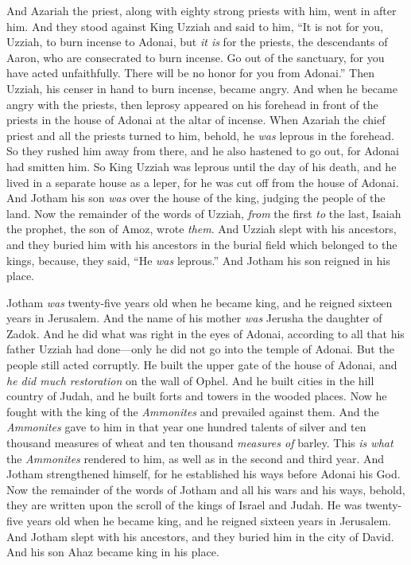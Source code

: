 \begin{biblechapter}
\verse And Azariah the priest, along with eighty strong priests with him, went in after him.
\verse And they stood against King Uzziah and said to him, “It is not for you, Uzziah, to burn incense to Adonai, but \textit{it is} for the priests, the descendants of Aaron, who are consecrated to burn incense. Go out of the sanctuary, for you have acted unfaithfully. There will be no honor for you from Adonai.”
\verse Then Uzziah, his censer in hand to burn incense, became angry. And when he became angry with the priests, then leprosy appeared on his forehead in front of the priests in the house of Adonai at the altar of incense.
\verse When Azariah the chief priest and all the priests turned to him, behold, he \textit{was} leprous in the forehead. So they rushed him away from there, and he also hastened to go out, for Adonai had smitten him.
\verse So King Uzziah was leprous until the day of his death, and he lived in a separate house as a leper, for he was cut off from the house of Adonai. And Jotham his son \textit{was} over the house of the king, judging the people of the land.
\verse Now the remainder of the words of Uzziah, \textit{from} the first \textit{to} the last, Isaiah the prophet, the son of Amoz, wrote \textit{them}.
\verse And Uzziah slept with his ancestors, and they buried him with his ancestors in the burial field which belonged to the kings, because, they said, “He \textit{was} leprous.” And Jotham his son reigned in his place.
\end{biblechapter}

\begin{biblechapter} %
 Jotham \textit{was} twenty-five years old when he became king, and he reigned sixteen years in Jerusalem. And the name of his mother \textit{was} Jerusha the daughter of Zadok.
\verse And he did what was right in the eyes of Adonai, according to all that his father Uzziah had done—only he did not go into the temple of Adonai. But the people still acted corruptly.
\verse He built the upper gate of the house of Adonai, and \textit{he did much restoration} on the wall of Ophel.
\verse And he built cities in the hill country of Judah, and he built forts and towers in the wooded places.
\verse Now he fought with the king of the \textit{Ammonites} and prevailed against them. And the \textit{Ammonites} gave to him in that year one hundred talents of silver and ten thousand measures of wheat and ten thousand \textit{measures of} barley. This \textit{is what} the \textit{Ammonites} rendered to him, as well as in the second and third year.
\verse And Jotham strengthened himself, for he established his ways before Adonai his God.
\verse Now the remainder of the words of Jotham and all his wars and his ways, behold, they are written upon the scroll of the kings of Israel and Judah.
\verse He was twenty-five years old when he became king, and he reigned sixteen years in Jerusalem.
\verse And Jotham slept with his ancestors, and they buried him in the city of David. And his son Ahaz became king in his place.
\end{biblechapter}

